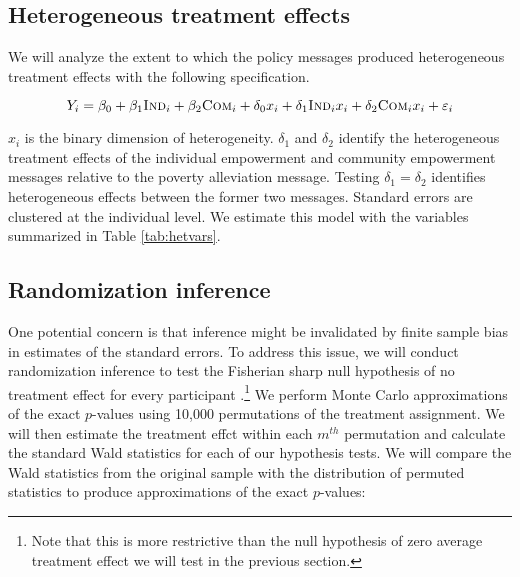 \documentclass[11pt, a4paper]{article}\usepackage[]{graphicx}\usepackage[]{color}
\begin{document}
    \subsection{Heterogeneous treatment effects}

        We will analyze the extent to which the policy messages produced heterogeneous treatment effects with the following specification.

        \begin{equation}
            Y_{i} = \beta_{0} + \beta_{1}\text{\textsc{Ind}}_{i} + \beta_{2}\text{\textsc{Com}}_{i} + \delta_{0} x_i + \delta_{1}\text{\textsc{Ind}}_{i} x_i + \delta_{2}\text{\textsc{Com}}_{i} x_i + \varepsilon_{i}
        \label{eq:heteffect} \end{equation}

        $x_{i}$ is the binary dimension of heterogeneity. $\delta_{1}$ and $\delta_{2}$ identify the heterogeneous treatment effects of the individual empowerment and community empowerment messages relative to the poverty alleviation message. Testing $\delta_{1} = \delta_{2}$ identifies heterogeneous effects between the former two messages. Standard errors are clustered at the individual level. We estimate this model with the  variables summarized in Table \ref{tab:hetvars}.

        \begin{table}[h]
        \centering
        \caption{Dimensions of heterogeneity}
        \label{tab:hetvars}
        \end{table}

    \subsection{Randomization inference}

        One potential concern is that inference might be invalidated by finite sample bias in estimates of the standard errors. To address this issue, we will conduct randomization inference to test the Fisherian sharp null hypothesis of no treatment effect for every participant \parencite{fisher_design_1935}.\footnote{Note that this is more restrictive than the null hypothesis of zero average treatment effect we will test in the previous section.} We perform Monte Carlo approximations of the exact $p$-values using 10,000 permutations of the treatment assignment. We will then estimate the treatment effct within each $m^{th}$ permutation and calculate the standard Wald statistics for each of our hypothesis tests. We will compare the Wald statistics from the original sample with the distribution of permuted statistics to produce approximations of the exact $p$-values:
\end{document}
